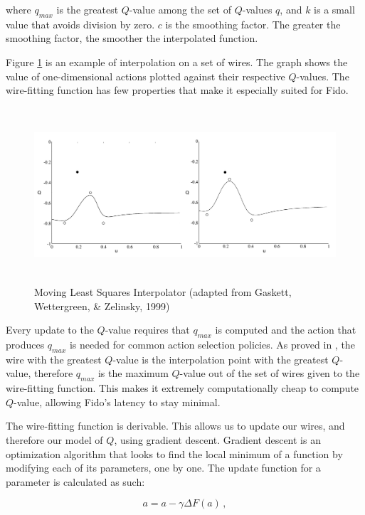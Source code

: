 \noindent
where $q_{max}$ is the greatest $Q$-value among the set of $Q$-values $q$, and $k$ is a small value that avoids division by zero.
$c$ is the smoothing factor.
The greater the smoothing factor, the smoother the interpolated function.


Figure \ref{fig::wirefitexample} is an example of interpolation on a set of wires.
The graph shows the value of one-dimensional actions plotted against their respective $Q$-values.
The wire-fitting function has few properties that make it especially suited for Fido.

\begin{figure}[ht]
    \centering
    \includegraphics[height=6.5cm]{Figures/WireFit.png}
	\caption{Moving Least Squares Interpolator (adapted from Gaskett, Wettergreen, \& Zelinsky, 1999)}
    \label{fig::wirefitexample}
\end{figure}

Every update to the $Q$-value requires that $q_{max}$ is computed and the action that produces $q_{max}$ is needed for common action selection policies.
As proved in \cite{baird}, the wire with the greatest $Q$-value is the interpolation point with the greatest $Q$-value, therefore $q_{max}$ is the maximum $Q$-value out of the set of wires given to the wire-fitting function.
This makes it extremely computationally cheap to compute $Q$-value, allowing Fido's latency to stay minimal.

The wire-fitting function is derivable.
This allows us to update our wires, and therefore our model of $Q$, using gradient descent.
Gradient descent is an optimization algorithm that looks to find the local minimum of a function by modifying each of its parameters, one by one.
The update function for a parameter is calculated as such:

\begin{equation}
	a = a - \gamma \Delta F(a)
	\,,
	\label{equ::wirefiterrorfunction}
\end{equation}

